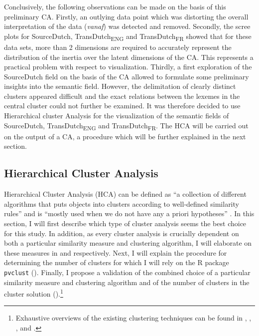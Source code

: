 Conclusively, the following observations can be made on the basis of this preliminary CA. Firstly, an outlying data point which was distorting the overall interpretation of the data (\textit{vanaf}) was detected and removed. Secondly, the scree plots for SourceDutch, TransDutch\textsubscript{ENG} and TransDutch\textsubscript{FR} showed that for these data sets, more than 2 dimensions are required to accurately represent the distribution of the inertia over the latent dimensions of the CA. This represents a practical problem with respect to visualization. Thirdly, a first exploration of the SourceDutch field on the basis of the CA allowed to formulate some preliminary insights into the semantic field. However, the delimitation of clearly distinct clusters appeared difficult and the exact relations between the lexemes in the central cluster could not further be examined. It was therefore decided to use Hierarchical cluster Analysis for the visualization of the semantic fields of SourceDutch, TransDutch\textsubscript{ENG} and TransDutch\textsubscript{FR}. The HCA will be carried out on the output of a CA, a procedure which will be further explained in the next section.

\subsection{Hierarchical Cluster Analysis}
\label{sec:3.7.2}  
Hierarchical Cluster Analysis (HCA) can be defined as “a collection of different algorithms that puts objects into clusters according to well-defined similarity rules” and is “mostly used when we do not have any a priori hypotheses” \citep[406]{glynn_cluster_2014}. In this section, I will first describe which type of cluster analysis seems the best choice for this study. In addition, as every cluster analysis is crucially dependent on both a particular similarity measure and clustering algorithm, I will elaborate on these measures in  and  respectively. Next, I will explain the procedure for determining the number of clusters for which I will rely on the R package \texttt{pvclust} \citep{suzuki_pvclust:_2006} (). Finally, I propose a validation of the combined choice of a particular similarity measure and clustering algorithm and of the number of clusters in the cluster solution ().\footnote{Exhaustive overviews of the existing clustering techniques can be found in \citet[495--523]{manning_foundations_1999}, \citet[138--148]{baayen_analyzing_2008},  \citet[71--110]{everitt_cluster_2011}, \citet[336--349]{gries_statistics_2013} and \citet{glynn_cluster_2014}.}

